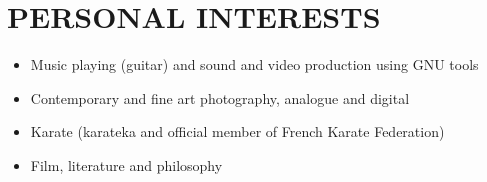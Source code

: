\documentclass[a4paper, oneside, final]{scrartcl}
\begin{document}
\section{PERSONAL INTERESTS}
\begin{itemize}
   \item Music playing (guitar) and sound and video production using GNU
            tools
   \item Contemporary and fine art photography, analogue and digital 
   \item Karate (karateka and official member of French Karate Federation)
   \item Film, literature and philosophy
\end{itemize}
\end{document}
